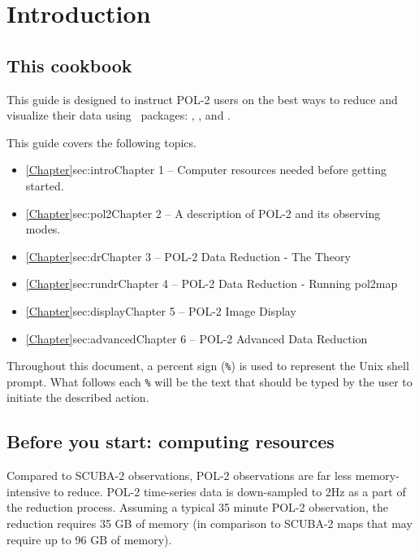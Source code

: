 \chapter{Introduction}
\label{sec:intro}

\renewcommand{\thepage}{\arabic{page}}
\setcounter{page}{1}

\section{This cookbook}

This guide is designed to instruct POL-2 users on the best ways to
reduce and visualize their data using \starlink\ packages: \smurf
\cite{smurf}, \Kappa , \polpack and \gaia.

This guide covers the following topics.
\begin{itemize}
\itemsep0em
\item \cref{Chapter}{sec:intro}{Chapter 1} -- Computer resources needed before getting started.
\item \cref{Chapter}{sec:pol2}{Chapter 2} -- A description of POL-2 and its observing modes.
\item \cref{Chapter}{sec:dr}{Chapter 3} -- POL-2 Data Reduction - The Theory
\item \cref{Chapter}{sec:rundr}{Chapter 4} -- POL-2 Data Reduction - Running pol2map
\item \cref{Chapter}{sec:display}{Chapter 5} -- POL-2 Image Display
\item \cref{Chapter}{sec:advanced}{Chapter 6} -- POL-2 Advanced Data Reduction

\end{itemize}

Throughout this document, a percent sign (\texttt{\%}) is used to
represent the Unix shell prompt. What follows each \texttt{\%} will be
the text that should be typed by the user to initiate the described action.

\section{ Before you start: computing resources}
\label{sec:computing}

Compared to SCUBA-2 observations, POL-2 observations are far less memory-intensive to reduce.
POL-2 time-series data is down-sampled to 2Hz as a part of the reduction process. Assuming a typical 35
minute POL-2 observation, the reduction requires 35 GB of memory (in comparison to SCUBA-2
maps that may require up to 96 GB of memory).

